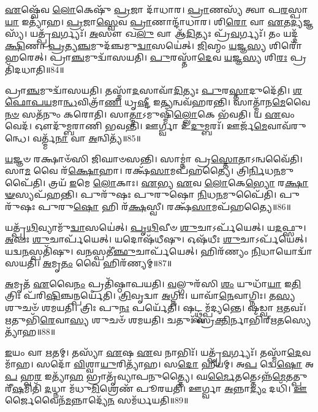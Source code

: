 \-\ul{𑌏}\-𑌷𑍍𑌵𑍇᳴𑌵 \ul{𑌲𑍋}\-𑌕𑍇𑌷𑍁᳴ \ul{𑌪𑍍𑌰}\-𑌜𑌾 𑌦𑌾᳴𑌧𑌾𑌰। 
\-\ul{𑌪𑍍𑌰𑌾}\-𑌣𑌸𑍍𑌯᳴ 𑌤𑍍𑌵𑌾 𑌪\-\ul{𑌰}\-𑌸𑍍𑌪𑌾\-\ul{𑌯𑌾} 𑌇𑌤𑍍𑌯𑌾᳴𑌹। 
\-\ul{𑌪𑍍𑌰}\-𑌜𑌾\-\ul{𑌸𑍍𑌵𑍇}\-𑌵 \ul{𑌪𑍍𑌰𑌾}\-𑌣𑌾𑌨𑍍𑌦𑌾᳴𑌧𑌾𑌰। 
𑌶𑌿\-\ul{𑌰𑍋} 𑌵𑌾 \ul{𑌏}\-𑌤\-\ul{𑌦𑍍𑌯}\-𑌜𑍍𑌞𑌸𑍍𑌯᳴। 
𑌯𑌤𑍍𑌪𑍍𑌰᳴\-\ul{𑌵}\-𑌰𑍍𑌗𑍍𑌯𑌃᳴। 
\-\ul{𑌅}\-𑌸𑍗 𑌖\-\ul{𑌲𑍁} 𑌵𑌾 𑌆᳴\-\ul{𑌦𑌿}\-𑌤𑍍𑌯𑌃 𑌪𑍍𑌰᳴\-\ul{𑌵}\-𑌰𑍍𑌗𑍍𑌯𑌃᳴। 
𑌤𑌂 𑌯𑌦𑍍𑌦᳴\-\ul{𑌕𑍍𑌷𑌿}\-𑌣𑌾 \ul{𑌪𑍍𑌰}\-𑌤𑍍𑌯\-\ul{𑌞𑍍𑌚}\-𑌮𑍁𑌦᳴𑌞𑍍𑌚𑌮𑍁\-\ul{𑌦𑍍𑌵𑌾}\-𑌸𑌯𑍇॑𑌤𑍍। 
\-\ul{𑌜𑌿}\-𑌹𑍍𑌮𑌂 \ul{𑌯}\-𑌜𑍍𑌞\-\ul{𑌸𑍍𑌯} 𑌶𑌿𑌰𑍋᳴ 𑌹𑌰𑍇𑌤𑍍। 
𑌪𑍍𑌰𑌾\-\ul{𑌞𑍍𑌚}\-𑌮𑍁𑌦𑍍𑌵𑌾᳴𑌸𑌯𑌤𑌿। 
\-\ul{𑌪𑍁}\-𑌰𑌸𑍍𑌤𑌾᳴\-\ul{𑌦𑍇}\-𑌵 \ul{𑌯}\-𑌜𑍍𑌞\-\ul{𑌸𑍍𑌯} 𑌶𑌿\-\ul{𑌰𑌃} 𑌪𑍍𑌰𑌤𑌿᳴𑌦𑌧𑌾𑌤𑌿॥84॥

𑌪𑍍𑌰𑌾\-\ul{𑌞𑍍𑌚}\-𑌮𑍁𑌦𑍍𑌵𑌾᳴𑌸𑌯𑌤𑌿। 
𑌤𑌸𑍍𑌮𑌾᳴\-\ul{𑌦}\-𑌸𑌾𑌵𑌾᳴\-\ul{𑌦𑌿}\-𑌤𑍍𑌯𑌃 \ul{𑌪𑍁}\-𑌰\-\ul{𑌸𑍍𑌤𑌾}\-𑌦𑍁𑌦𑍇᳴𑌤𑌿। 
\-\ul{𑌶}\-\-\ul{𑌫𑍋}\-\-\ul{𑌪}\-\-\ul{𑌯}\-\-𑌮𑌾\-\ul{𑌨𑍍𑌧}\-𑌵𑌿𑌤𑍍𑌰𑌾᳴\-\ul{𑌣𑌿} 𑌧𑍃\-\ul{𑌷𑍍𑌟𑍀} 𑌇\-\ul{𑌤𑍍𑌯}\-𑌨𑍍𑌵𑌵᳴𑌹𑌰𑌨𑍍𑌤𑌿। 
𑌸𑌾𑌤𑍍𑌮𑌾᳴𑌨\-\ul{𑌮𑍇}\-𑌵𑍈\-\ul{𑌨}\-\-\ul{𑍞} 𑌸𑌤᳴𑌨𑍁𑌂 𑌕𑌰𑍋𑌤𑌿। 
𑌸𑌾\-\ul{𑌤𑍍𑌮𑌾}\-𑌽𑌮𑍁𑌷𑍍𑌮𑌿𑌁᳴\-\ul{𑌲𑍍𑌲𑍋}\-𑌕𑍇 𑌭᳴𑌵𑌤𑌿। 
𑌯 \ul{𑌏}\-𑌵𑌂 𑌵𑍇𑌦᳴। 
𑌔𑌦𑍁᳴𑌮𑍍𑌬𑌰𑌾𑌣𑌿 𑌭𑌵𑌨𑍍𑌤𑌿। 
𑌊𑌰𑍍𑌗𑍍𑌵𑌾 𑌉᳴\-\ul{𑌦𑍁}\-𑌮𑍍𑌬𑌰𑌃᳴। 
𑌊𑌰𑍍𑌜᳴\-\ul{𑌮𑍇}\-𑌵𑌾𑌵᳴𑌰𑍁𑌨𑍍𑌧𑍇। 
𑌵𑌰𑍍𑌤𑍍𑌮᳴\-\ul{𑌨𑌾} 𑌵𑌾 \ul{𑌅}\-𑌨𑍍𑌵𑌿𑌤𑍍𑌯᳴॥85॥

\-\ul{𑌯}\-𑌜𑍍𑌞𑍞 𑌰𑌕𑍍𑌷𑌾𑍞᳴𑌸𑌿 𑌜𑌿𑌘𑌾𑍞𑌸𑌨𑍍𑌤𑌿। 
𑌸𑌾𑌮𑍍𑌨𑌾॑ 𑌪𑍍𑌰\-\ul{𑌸𑍍𑌤𑍋}\-𑌤𑌾𑌽𑌨𑍍𑌵𑌵𑍈᳴𑌤𑌿। 
𑌸𑌾\-\ul{𑌮} 𑌵𑍈 𑌰᳴\-\ul{𑌕𑍍𑌷𑍋}\-𑌹𑌾। 
𑌰𑌕𑍍𑌷᳴\-\ul{𑌸𑌾}\-𑌮𑌪᳴𑌹𑌤𑍍𑌯𑍈। 
𑌤𑍍𑌰𑌿\-\ul{𑌰𑍍𑌨𑌿}\-𑌧\-\ul{𑌨}\-𑌮𑍁𑌪𑍈᳴𑌤𑌿। 
𑌤𑍍𑌰𑌯᳴ \ul{𑌇}\-𑌮𑍇 \ul{𑌲𑍋}\-𑌕𑌾𑌃। 
\-\ul{𑌏}\-𑌭𑍍𑌯 \ul{𑌏}\-𑌵 \ul{𑌲𑍋}\-𑌕𑍇\-\ul{𑌭𑍍𑌯𑍋} 𑌰\-\ul{𑌕𑍍𑌷𑌾}\-\-\ul{𑍟}\-𑌸𑍍𑌯𑌪᳴𑌹𑌨𑍍𑌤𑌿। 
𑌪𑍁𑌰𑍁᳴𑌷𑌃 𑌪𑍁𑌰𑍁𑌷𑍋 \ul{𑌨𑌿}\-𑌧\-\ul{𑌨}\-𑌮𑍁𑌪𑍈᳴𑌤𑌿। 
𑌪𑍁𑌰𑍁᳴𑌷𑌃 𑌪𑍁𑌰𑍁\-\ul{𑌷𑍋} 𑌹𑌿 𑌰᳴\-\ul{𑌕𑍍𑌷}\-𑌸𑍍𑌵𑍀। 
𑌰𑌕𑍍𑌷᳴\-\ul{𑌸𑌾}\-𑌮𑌪᳴𑌹𑌤𑍍𑌯𑍈॥86॥

𑌯𑌤𑍍𑌪𑍃᳴\-\ul{𑌥𑌿}\-𑌵𑍍𑌯𑌾𑌮𑍁᳴\-\ul{𑌦𑍍𑌵𑌾}\-𑌸𑌯𑍇॑𑌤𑍍। 
\-\ul{𑌪𑍃}\-\-\ul{𑌥𑌿}\-𑌵𑍀𑍞 \ul{𑌶𑍁}\-𑌚𑌾𑌽𑌰𑍍𑌪᳴𑌯𑍇𑌤𑍍। 
𑌯\-\ul{𑌦}\-𑌫𑍍𑌸𑍁। 
\-\ul{𑌅}\-𑌪𑌃  \ul{𑌶𑍁}\-𑌚𑌾𑌰𑍍𑌪᳴𑌯𑍇𑌤𑍍। 
𑌯𑌦𑍋𑌷᳴𑌧𑍀𑌷𑍁। 
𑌓𑌷᳴𑌧𑍀𑌃  \ul{𑌶𑍁}\-𑌚𑌾𑌽𑌰𑍍𑌪᳴𑌯𑍇𑌤𑍍। 
𑌯𑌦𑍍𑌵\-\ul{𑌨}\-𑌸𑍍𑌪𑌤𑌿᳴𑌷𑍁। 
𑌵\-\ul{𑌨}\-𑌸𑍍𑌪𑌤𑍀॑\-\ul{𑌞𑍍𑌛𑍁}\-𑌚𑌾𑌰𑍍𑌪᳴𑌯𑍇𑌤𑍍। 
𑌹𑌿𑌰᳴𑌣𑍍𑌯𑌂 \ul{𑌨𑌿}\-𑌧𑌾𑌯𑍋𑌦𑍍𑌵𑌾᳴𑌸𑌯𑌤𑌿। 
\-\ul{𑌅}\-𑌮𑍃\-\ul{𑌤𑌂} 𑌵𑍈 𑌹𑌿𑌰᳴𑌣𑍍𑌯𑌮𑍍॥87॥

\-\ul{𑌅}\-𑌮𑍃𑌤᳴ \ul{𑌏}\-𑌵𑍈\-\ul{𑌨𑌂} 𑌪𑍍𑌰𑌤𑌿᳴𑌷𑍍𑌠𑌾𑌪𑌯𑌤𑌿। 
\-\ul{𑌵}\-𑌲𑍍𑌗𑍁𑌰᳴𑌸𑌿 \ul{𑌶𑌂} 𑌯𑍁𑌧𑌾᳴\-\ul{𑌯𑌾} 𑌇\-\ul{𑌤𑌿} 𑌤𑍍𑌰𑌿𑌃 𑌪᳴𑌰𑌿\-\ul{𑌷𑌿}\-𑌞𑍍𑌚𑌨𑍍𑌪𑌰𑍍𑌯𑍇᳴𑌤𑌿। 
\-\ul{𑌤𑍍𑌰𑌿}\-𑌵𑍃𑌦𑍍𑌵𑌾 \ul{𑌅}\-𑌗𑍍𑌨𑌿𑌃। 
𑌯𑌾𑌵𑌾᳴\-\ul{𑌨𑍇}\-𑌵𑌾𑌗𑍍𑌨𑌿𑌃। 
𑌤\-\ul{𑌸𑍍𑌯} 𑌶𑍁𑌚𑍞᳴ 𑌶𑌮𑌯𑌤𑌿। 
𑌤𑍍𑌰𑌿𑌃 𑌪𑍁\-\ul{𑌨𑌃} 𑌪𑌰𑍍𑌯𑍇᳴𑌤𑌿। 
𑌷𑌟𑍍𑌥𑍍𑌸𑌮𑍍𑌪᳴𑌦𑍍𑌯𑌨𑍍𑌤𑍇। 
𑌷𑌡𑍍𑌵𑌾 \ul{𑌋}\-𑌤𑌵𑌃᳴। 
\-\ul{𑌋}\-𑌤𑍁𑌭𑌿᳴\-\ul{𑌰𑍇}\-𑌵𑌾\-\ul{𑌸𑍍𑌯} 𑌶𑍁𑌚𑍞᳴ 𑌶𑌮𑌯𑌤𑌿। 
𑌚𑌤𑍁𑌃᳴ 𑌸𑍍𑌰\-\ul{𑌕𑍍𑌤𑌿}\-𑌰𑍍𑌨𑌾𑌭𑌿᳴𑌰𑍍\mbox{}\-\ul{𑌋}\-𑌤𑌸𑍍𑌯𑍇𑌤𑍍𑌯𑌾᳴𑌹॥88॥

\-\ul{𑌇}\-𑌯𑌂 𑌵𑌾 \ul{𑌋}\-𑌤𑌮𑍍। 
𑌤𑌸𑍍𑌯𑌾᳴ \ul{𑌏}\-𑌷 \ul{𑌏}\-𑌵 𑌨𑌾𑌭𑌿𑌃᳴। 
𑌯𑌤𑍍𑌪𑍍𑌰᳴\-\ul{𑌵}\-𑌰𑍍𑌗𑍍𑌯𑌃᳴। 
𑌤𑌸𑍍𑌮𑌾᳴\-\ul{𑌦𑍇}\-𑌵𑌮𑌾᳴𑌹। 
𑌸𑌦𑍋᳴ \ul{𑌵𑌿}\-𑌶𑍍𑌵𑌾\-\ul{𑌯𑍁}\-𑌰𑌿𑌤𑍍𑌯𑌾᳴𑌹। 
𑌸\-\ul{𑌦𑍋} 𑌹𑍀𑌯𑌮𑍍। 
𑌅\-\ul{𑌪} 𑌦𑍍𑌵𑍇\-\ul{𑌷𑍋} 𑌅\-\ul{𑌪} 𑌹𑍍𑌵\-\ul{𑌰} 𑌇𑌤𑍍𑌯𑌾᳴\-\ul{𑌹} 𑌭𑍍𑌰𑌾𑌤𑍃᳴𑌵𑍍𑌯𑌾𑌪𑌨𑍁𑌤𑍍𑌤𑍍𑌯𑍈। 
𑌘\-\ul{𑌰𑍍𑌮𑍈}\-𑌤𑌤𑍍𑌤𑍇𑌽𑌨𑍍𑌨᳴\-\ul{𑌮𑍇}\-𑌤𑌤𑍍𑌪𑍁𑌰𑍀᳴\-\ul{𑌷}\-𑌮𑌿𑌤𑌿᳴ \ul{𑌦}\-𑌧𑍍𑌨𑌾 𑌮᳴𑌧𑍁\-\ul{𑌮𑌿}\-𑌶𑍍𑌰𑍇𑌣᳴ 𑌪𑍂𑌰𑌯𑌤𑌿। 
𑌊𑌰𑍍𑌗𑍍𑌵𑌾 \ul{𑌅}\-𑌨𑍍𑌨𑌾\-\ul{𑌦𑍍𑌯𑌂} 𑌦𑌧𑌿᳴। 
\-\ul{𑌊}\-𑌰𑍍𑌜𑍈𑌵𑍈𑌨᳴\-\ul{𑌮}\-𑌨𑍍𑌨𑌾𑌦𑍍𑌯𑍇᳴\-\ul{𑌨} 𑌸𑌮᳴𑌰𑍍𑌧𑌯𑌤𑌿॥89॥

